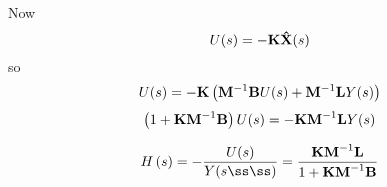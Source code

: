Now
\[
U(s) =  - {\bf{K\hat X}}(s) 
\]
so
\[
U (s) =   - {\bf{K}}\left( {{\bf{M}}^{ - 1} {\bf{B}}U(s) + {\bf{M}}^{ - 1} {\bf{L}}Y(s)} \right) 
\]
\[
 \left( {1 + {\bf{KM}}^{ - 1} {\bf{B}}} \right)U(s) =  - {\bf{KM}}^{ - 1} {\bf{L}}Y(s)
\]

\[ 
H\left( s \right) =  - \frac{U(s)}{Y(sßß)} = \frac{{{\bf{KM}}^{ - 1} {\bf{L}}}}{{1 + {\bf{KM}}^{ - 1} {\bf{B}}}} 
\]




\endinput

